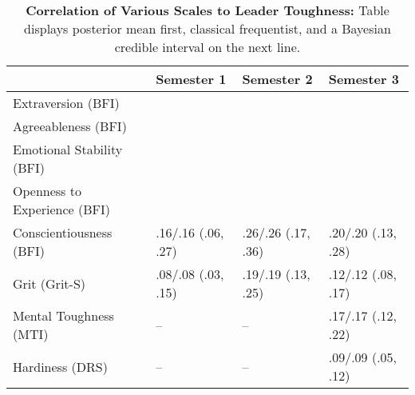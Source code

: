 \begin{table}[ht]
\centering
\begin{tabular}{llll}
  \hline
 & Semester 1 & Semester 2 & Semester 3 \\ 
  \hline
Extraversion (BFI) &  &  &  \\ 
  Agreeableness (BFI) &  &  &  \\ 
  Emotional Stability (BFI) &  &  &  \\ 
  Openness to Experience (BFI) &  &  &  \\ 
  Conscientiousness (BFI) & .16/.16 (.06, .27) & .26/.26 (.17, .36) & .20/.20 (.13, .28) \\ 
  Grit (Grit-S) & .08/.08 (.03, .15) & .19/.19 (.13, .25) & .12/.12 (.08, .17) \\ 
  Mental Toughness (MTI) & -- & -- & .17/.17 (.12, .22) \\ 
  Hardiness (DRS) & -- & -- & .09/.09 (.05, .12) \\ 
   \hline
\end{tabular}
\caption{\textbf{Correlation of Various Scales to Leader Toughness:} Table displays posterior mean first, classical frequentist, and a Bayesian credible interval on the next line.} 
\label{tab:pers_corr}
\end{table}

